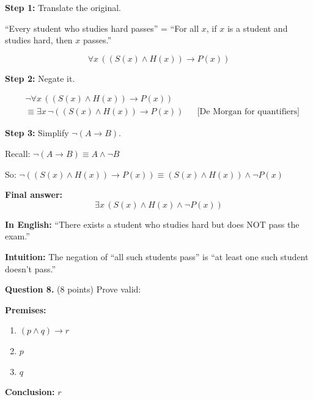 \documentclass[11pt,a4paper]{article}
\begin{document}
\begin{solnbox}
\textbf{Step 1:} Translate the original.

``Every student who studies hard passes'' = ``For all $x$, if $x$ is a student and studies hard, then $x$ passes.''

$$\forall x\, ((S(x) \land H(x)) \to P(x))$$

\textbf{Step 2:} Negate it.

\begin{align*}
&\neg \forall x\, ((S(x) \land H(x)) \to P(x)) \\
&\equiv \exists x\, \neg((S(x) \land H(x)) \to P(x)) && \text{[De Morgan for quantifiers]}
\end{align*}

\textbf{Step 3:} Simplify $\neg(A \to B)$.

Recall: $\neg(A \to B) \equiv A \land \neg B$

So: $\neg((S(x) \land H(x)) \to P(x)) \equiv (S(x) \land H(x)) \land \neg P(x)$

\textbf{Final answer:}
$$\boxed{\exists x\, (S(x) \land H(x) \land \neg P(x))}$$

\textbf{In English:} ``There exists a student who studies hard but does NOT pass the exam.''

\textbf{Intuition:} The negation of ``all such students pass'' is ``at least one such student doesn't pass.''
\end{solnbox}

\vspace{15pt}

\textbf{Question 8.} (8 points) Prove valid:

\textbf{Premises:}
\begin{enumerate}[noitemsep]
    \item $(p \land q) \to r$
    \item $p$
    \item $q$
\end{enumerate}

\textbf{Conclusion:} $r$
\end{document}
